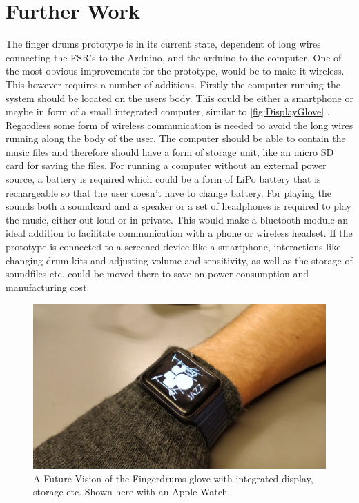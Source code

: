 \chapter{Further Work}
\label{further_work}

The finger drums prototype is in its current state, dependent of long wires connecting the FSR's to the Arduino, and the arduino to the computer. One of the most obvious improvements for the prototype, would be to make it wireless. This however requires a number of additions. Firstly the computer running the system should be located on the users body. This could be either a smartphone or maybe in form of a small integrated computer, similar to \autoref{fig:DisplayGlove} . Regardless some form of wireless communication is needed to avoid the long wires running along the body of the user. The computer should be able to contain the music files and therefore should have a form of storage unit, like an micro SD card for saving the files. For running a computer without an external power source, a battery is required which could be a form of LiPo battery that is rechargeable so that the user doesn't have to change battery. For playing the sounds both a soundcard and a speaker or a set of headphones is required to play the music, either out loud or in private. This would make a bluetooth module an ideal addition to facilitate communication with a phone or wireless headset.
If the prototype is connected to a screened device like a smartphone, interactions like changing drum kits and adjusting volume and sensitivity, as well as the storage of soundfiles etc. could be moved there to save on power consumption and manufacturing cost.

\begin{figure}[H]
\centering
\includegraphics[scale=0.05]{Figure/Billeder/DisplayGlove.jpg}
\caption{A Future Vision of the Fingerdrums glove with integrated display, storage etc. Shown here with an Apple Watch.}
\label{fig:DisplayGlove}
\end{figure}

